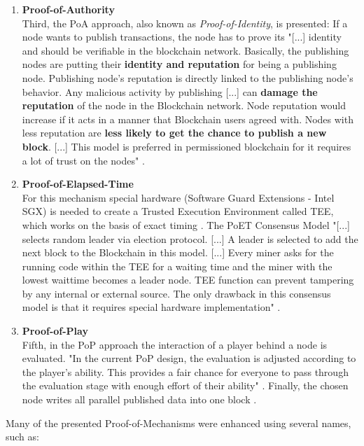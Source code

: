 \begin{enumerate}
	\item \textbf{Proof-of-Authority} \label{sec:DefPoA} \\
	Third, the \gls{PoA} approach, also known as \textit{Proof-of-Identity}, is presented:
	If a node wants to publish transactions, the node has to prove its "[...] identity and should be verifiable in the blockchain network.
	Basically, the publishing nodes are putting their \textbf{identity and reputation} for being a publishing node.
	Publishing node's reputation is directly linked to the publishing node's behavior.
	Any malicious activity by publishing [...] can \textbf{damage the reputation} of the node in the Blockchain network.
	Node reputation would increase if it acts in a manner that Blockchain users agreed with.
	Nodes with less reputation are \textbf{less likely to get the chance to publish a new block}. [...] 
	This model is preferred in permissioned blockchain for it requires a lot of trust on the nodes"	\cite[3]{Khan.2020}.
	
	\item \textbf{Proof-of-Elapsed-Time} \label{sec:DefPoET} \\
	For this mechanism special hardware (Software Guard Extensions - Intel SGX) is needed
	to create a Trusted Execution Environment called TEE, which works on the basis of exact timing \cite[55]{Dib.2018}.
	The \gls{PoET} Consensus Model "[...] selects random leader via election protocol. [...]
	A leader is selected to add the next block to the Blockchain in this model. [...]
	Every miner asks for the running code within the TEE for a waiting time and the miner with the lowest waittime becomes a leader node.
	TEE function can prevent tampering by any internal or external source.
	The only drawback in this consensus model is that it requires special hardware implementation" \cite[3-4]{Khan.2020}.
	
	\item \textbf{Proof-of-Play} \label{sec:DefPoP} \\
	Fifth, in the \gls{PoP} approach the interaction of a player behind a node is evaluated.
	"In the current \gls{PoP} design, the evaluation is adjusted according to the player’s ability.
	This provides a fair chance for everyone to pass through the evaluation stage with enough effort of their ability" \cite[23]{Yuen.2019}.
	Finally, the chosen node writes all parallel published data into one block \cite[23]{Yuen.2019}.
	
\end{enumerate}
\noindent Many of the presented Proof-of-Mechanisms were enhanced using several names, such as: \\

